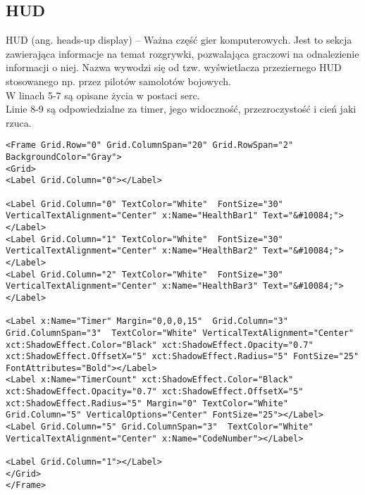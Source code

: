 \subsection{HUD}
HUD (ang. heads-up display) – Ważna część gier komputerowych. Jest to sekcja zawierająca informacje na temat rozgrywki, pozwalająca graczowi na odnalezienie informacji o niej. Nazwa wywodzi się od tzw. wyświetlacza przeziernego HUD stosowanego np. przez pilotów samolotów bojowych.
\\
W linach 5-7 są opisane życia w postaci serc.
\\
Linie 8-9 są odpowiedzialne za timer, jego widoczność, przezroczystość i cień jaki rzuca.
\begin{lstlisting}[caption=HUD]
            <Frame Grid.Row="0" Grid.ColumnSpan="20" Grid.RowSpan="2" BackgroundColor="Gray">
<Grid>
<Label Grid.Column="0"></Label>

<Label Grid.Column="0" TextColor="White"  FontSize="30" VerticalTextAlignment="Center" x:Name="HealthBar1" Text="&#10084;"></Label>
<Label Grid.Column="1" TextColor="White"  FontSize="30" VerticalTextAlignment="Center" x:Name="HealthBar2" Text="&#10084;"></Label>
<Label Grid.Column="2" TextColor="White"  FontSize="30" VerticalTextAlignment="Center" x:Name="HealthBar3" Text="&#10084;"></Label>

<Label x:Name="Timer" Margin="0,0,0,15"  Grid.Column="3" Grid.ColumnSpan="3"  TextColor="White" VerticalTextAlignment="Center" xct:ShadowEffect.Color="Black" xct:ShadowEffect.Opacity="0.7" xct:ShadowEffect.OffsetX="5" xct:ShadowEffect.Radius="5" FontSize="25" FontAttributes="Bold"></Label>
<Label x:Name="TimerCount" xct:ShadowEffect.Color="Black" xct:ShadowEffect.Opacity="0.7" xct:ShadowEffect.OffsetX="5" xct:ShadowEffect.Radius="5" Margin="0" TextColor="White" Grid.Column="5" VerticalOptions="Center" FontSize="25"></Label>
<Label Grid.Column="5" Grid.ColumnSpan="3"  TextColor="White" VerticalTextAlignment="Center" x:Name="CodeNumber"></Label>

<Label Grid.Column="1"></Label>
</Grid>
</Frame>
\end{lstlisting}


